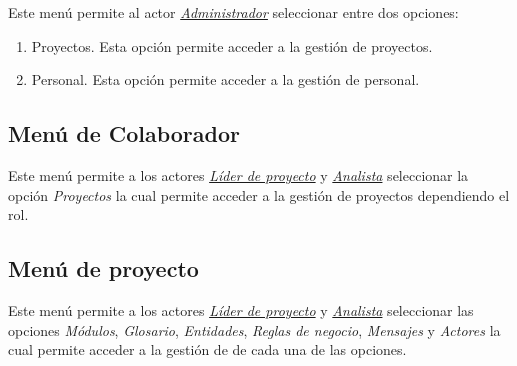  Este menú permite al actor {\em {\hyperlink{admin}{Administrador}}} seleccionar entre dos opciones:
 
 	\begin{enumerate}
 		\item Proyectos. Esta opción permite acceder a la gestión de proyectos.
 		\item Personal. Esta opción permite acceder a la gestión de personal.
 	\end{enumerate}
 
 
 \subsection{Menú de Colaborador} Este menú permite a los actores {\em {\hyperlink{lider}{Líder de proyecto}}} y {\em {\hyperlink{analista}{Analista}}} seleccionar la opción {\em Proyectos} la cual permite acceder a la gestión de proyectos dependiendo el rol.
 
  
  \subsection{Menú de proyecto} Este menú permite a los actores {\em {\hyperlink{lider}{Líder de proyecto}}} y {\em {\hyperlink{analista}{Analista}}} seleccionar las opciones {\em Módulos}, {\em Glosario}, {\em Entidades}, {\em Reglas de negocio}, {\em Mensajes} y {\em Actores} la cual permite acceder a la gestión de de cada una de las opciones.
 
